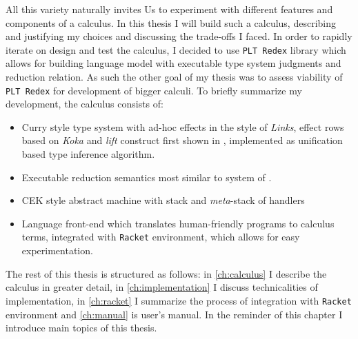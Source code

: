 \documentclass[inz, english, shortabstract]{iithesis}
\newcommand{\Redex}{\texttt{PLT Redex} }
\newcommand{\Racket}{\texttt{Racket} }
\begin{document}
All this variety naturally invites Us to experiment with different features and components of a calculus.
In this thesis I will build such a calculus, describing and justifying my choices and discussing the trade-offs I faced.
In order to rapidly iterate on design and test the calculus, I decided to use \Redex library which allows for building language model with executable type system judgments and reduction relation.
As such the other goal of my thesis was to assess viability of \Redex for development of bigger calculi.
To briefly summarize my development, the calculus consists of: 
\begin{itemize}
  \item Curry style type system with ad-hoc effects in the style of \emph{Links}, effect rows based on \emph{Koka} and \emph{lift} construct first shown in \cite{Biernacki2017}, implemented as unification based type inference algorithm.
  \item Executable reduction semantics most similar to system of \cite{Biernacki2017}.
  \item CEK style abstract machine with stack and \emph{meta}-stack of handlers
  \item Language front-end which translates human-friendly programs to calculus terms, integrated with \Racket environment, which allows for easy experimentation.
\end{itemize}

The rest of this thesis is structured as follows: in \autoref{ch:calculus} I describe the calculus in greater detail, in \autoref{ch:implementation} I discuss technicalities of implementation, in \autoref{ch:racket} I summarize the process of integration with \Racket environment and \autoref{ch:manual} is user's manual.
In the reminder of this chapter I introduce main topics of this thesis.
\end{document}
